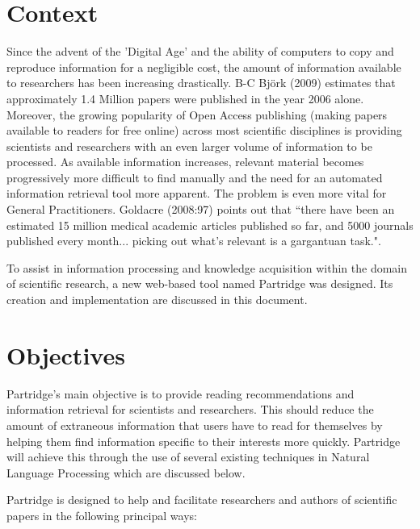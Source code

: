 %
%
\section{Context}

Since the advent of the 'Digital Age' and the ability of computers to copy and
reproduce information for a negligible cost, the amount of information
available to researchers has been increasing drastically.  B-C Bj\"{o}rk (2009)
estimates that approximately 1.4 Million papers were published in the year 2006
alone\cite{bjork2009}. Moreover, the growing popularity of Open Access
publishing (making papers available to readers for free online\cite{Suber2012})
across most scientific disciplines\cite{bjork2009}\cite{harnad2004comparing} is
providing scientists and researchers with an even larger volume of information
to be processed. As available information increases, relevant material becomes
progressively more difficult to find manually and the need for an automated
information retrieval tool more apparent. The problem is even more vital for
General Practitioners. Goldacre (2008:97) points out that ``there have been an
estimated 15 million medical academic articles published so far, and 5000
journals published every month... picking out what's relevant is a gargantuan
task."\cite{goldacre2008bad}.

To assist in information processing and knowledge acquisition within the domain
of scientific research, a new web-based tool named Partridge was designed. Its
creation and implementation are discussed in this document.

\section{Objectives}

Partridge's main objective is to provide reading recommendations and
information retrieval for scientists and researchers. This should reduce the
amount of extraneous information that users have to read for themselves by
helping them find information specific to their interests more quickly.
Partridge will achieve this through the use of several existing techniques in
Natural Language Processing which are discussed below.

Partridge is designed to help and facilitate researchers and authors of
scientific papers in the following principal ways:

